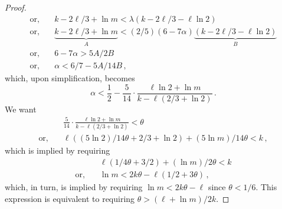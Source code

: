 \begin{proof}
\begin{align*}
    \text{or},\quad& k - 2\ell/3 + \ln m < \lambda( k -2\ell/3 - \ell \ln 2) \\
    \text{or},\quad&\underbrace{k - 2\ell/3 + \ln m}_{A} < (2/5)(6 - 7 \alpha) \underbrace{ ( k -2\ell/3 - \ell \ln 2) }_{B}\\
    \text{or},\quad&6 - 7 \alpha > 5A/2B\\
    \text{or},\quad& \alpha < 6/7 - 5A/14B\,,
\end{align*}
which, upon simplification, becomes
\[
    \alpha < \frac{1}{2} -\frac{5}{14}\cdot \frac{\ell \ln 2 + \ln m}{k - \ell(2/3 + \ln 2)}
    \,.
\]
We want
\begin{align*}
    &\frac{5}{14}\cdot \frac{\ell \ln 2 + \ln m}{k - \ell(2/3 + \ln 2)} < \theta \\
    \text{or,}\quad& \ell \left( (5 \ln 2)/14\theta + 2/3 + \ln 2\right) + (5 \ln m)/14\theta < k 
    \,,
\end{align*}
which is implied by requiring
\begin{align*}
    &\ell \left( 1/4\theta + 3/2 \right) + (\ln m)/2\theta < k \\
    \text{or,}\quad&\ln m < 2k\theta - \ell(1/2 + 3\theta)
    \,,
\end{align*}
which, in turn, is implied by requiring $\ln m < 2k\theta - \ell$ since $\theta < 1/6$. 
This expression is equivalent to requiring $\theta > (\ell + \ln m)/2k$.


\end{proof}
